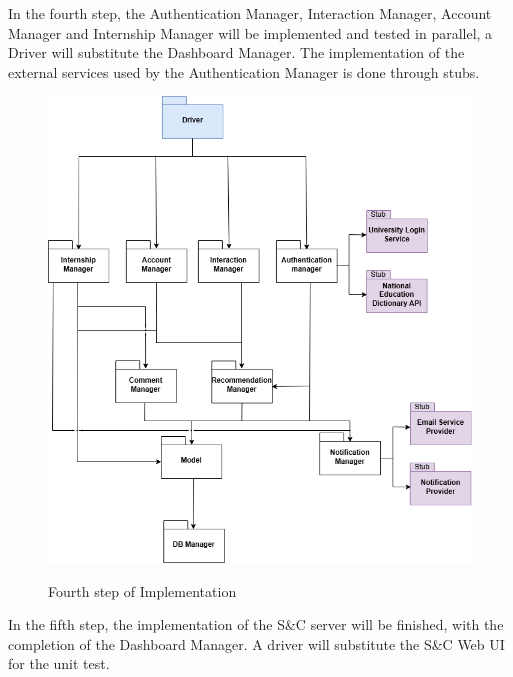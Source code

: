 \documentclass[a4paper,12pt]{article}
\begin{document}
In the fourth step, the Authentication Manager, Interaction Manager, Account Manager and Internship Manager will be implemented and tested in parallel, a Driver will
substitute the Dashboard Manager. The implementation of the external services used by the Authentication Manager is done through stubs.

\begin{figure}[H]
\centering
\includegraphics[scale = 0.7]{DD_figures/ImplementationDiagrams/FourthStep.png}\\
\caption{Fourth step of Implementation}
\end{figure}
\newpage

In the fifth step, the implementation of the S\&C server will be finished, with the completion of the Dashboard Manager. A driver will substitute the S\&C Web UI for the unit test.
\end{document}
